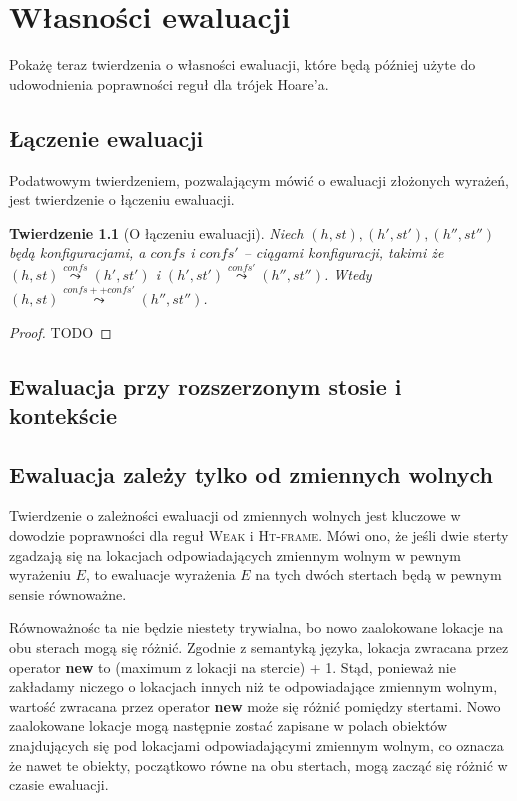 \documentclass[]{pracamgr}
\renewcommand \| {\hspace{0.75em} | \hspace{0.75em} }
\renewcommand \[ {[\![}
\renewcommand \] {]\!]}
\newcommand \eval [1] {\overset{#1}{\leadsto}}
\newtheorem{theorem}{Twierdzenie}
\theoremstyle{definition}
\begin{document}
\chapter{Własności ewaluacji}
Pokażę teraz twierdzenia o własności ewaluacji, które będą później użyte do udowodnienia poprawności reguł dla trójek Hoare'a.
\section{Łączenie ewaluacji}
Podatwowym twierdzeniem, pozwalającym mówić o ewaluacji złożonych wyrażeń, jest twierdzenie o łączeniu ewaluacji.
\begin{theorem}[O łączeniu ewaluacji]
Niech $(h, st), (h', st'), (h'', st'')$ będą konfiguracjami, a $confs$ i $confs'$ -- ciągami konfiguracji,
takimi że $(h, st) \eval{confs} (h', st')$ i $(h', st') \eval{confs'} (h'', st'')$.
Wtedy $(h, st) \eval{confs ++ confs'} (h'', st'')$.
\end{theorem}
\begin{proof}
TODO
\end{proof}

\section{Ewaluacja przy rozszerzonym stosie i kontekście}

\section{Ewaluacja zależy tylko od zmiennych wolnych}
Twierdzenie o zależności ewaluacji od zmiennych wolnych jest kluczowe w dowodzie poprawności dla
reguł \textsc{Weak} i \textsc{Ht-frame}.
Mówi ono, że jeśli dwie sterty zgadzają się na lokacjach odpowiadających zmiennym wolnym w pewnym wyrażeniu $E$,
to ewaluacje wyrażenia $E$ na tych dwóch stertach będą w pewnym sensie równoważne.

Równoważnośc ta nie będzie niestety trywialna, bo nowo zaalokowane lokacje na obu sterach mogą się różnić.
Zgodnie z semantyką języka, lokacja zwracana przez operator \textbf{new} to (maximum z lokacji na stercie) + 1.
Stąd, ponieważ nie zakładamy niczego o lokacjach innych niż te odpowiadające zmiennym wolnym,
wartość zwracana przez operator \textbf{new} może się różnić pomiędzy stertami.
Nowo zaalokowane lokacje mogą następnie zostać zapisane w polach obiektów znajdujących się pod lokacjami
odpowiadającymi zmiennym wolnym, co oznacza że nawet te obiekty, początkowo równe na obu stertach,
mogą zacząć się różnić w czasie ewaluacji.
\end{document}
